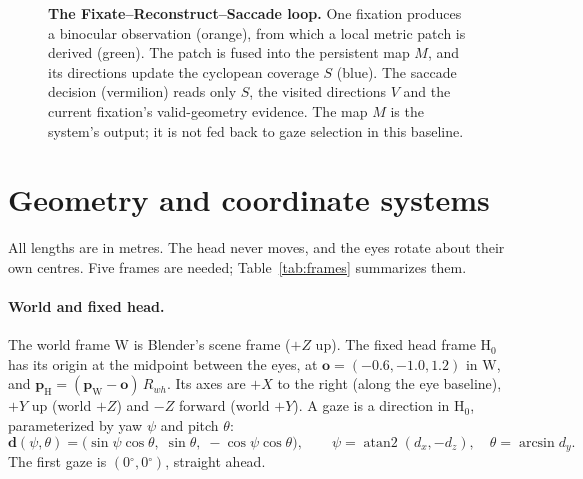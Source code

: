 \documentclass[11pt,a4paper]{article}
\newcommand{\Hz}{\ensuremath{\mathrm{H}_0}}
\newcommand{\degr}{\ensuremath{^\circ}}
\begin{document}
\begin{figure}[t]
\caption{\textbf{The Fixate--Reconstruct--Saccade loop.} One fixation produces a binocular observation (orange), from
which a local metric patch is derived (green). The patch is fused into the persistent map $M$, and its directions
update the cyclopean coverage $S$ (blue). The saccade decision (vermilion) reads only $S$, the visited directions $V$
and the current fixation's valid-geometry evidence. The map $M$ is the system's output; it is not fed back to gaze
selection in this baseline.}
\label{fig:loop}
\end{figure}

\section{Geometry and coordinate systems}\label{sec:geometry}

All lengths are in metres. The head never moves, and the eyes rotate about their own centres. Five frames are needed;
Table~\ref{tab:frames} summarizes them.

\paragraph{World and fixed head.} The world frame W is Blender's scene frame ($+Z$ up). The fixed head frame \Hz{} has
its origin at the midpoint between the eyes, at $\mathbf{o} = (-0.6, -1.0, 1.2)$ in W, and
$\mathbf{p}_{\mathrm{H}} = (\mathbf{p}_{\mathrm{W}} - \mathbf{o})\,R_{wh}$. Its axes are $+X$ to the right (along the
eye baseline), $+Y$ up (world $+Z$) and $-Z$ forward (world $+Y$). A gaze is a direction in \Hz{}, parameterized by yaw
$\psi$ and pitch $\theta$:
\begin{equation}
  \mathbf{d}(\psi,\theta) = \bigl(\sin\psi\cos\theta,\; \sin\theta,\; -\cos\psi\cos\theta\bigr),
  \qquad
  \psi = \operatorname{atan2}(d_x, -d_z),\quad \theta = \arcsin d_y .
  \label{eq:gaze}
\end{equation}
The first gaze is $(0\degr, 0\degr)$, straight ahead.
\end{document}
